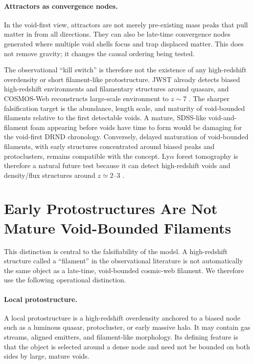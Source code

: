 \documentclass[11pt,a4paper]{article}
\begin{document}
\paragraph{Attractors as convergence nodes.}
In the void-first view, attractors are not merely pre-existing mass peaks that pull matter in from all directions. They can also be late-time convergence nodes generated where multiple void shells focus and trap displaced matter. This does not remove gravity; it changes the causal ordering being tested.

The observational ``kill switch'' is therefore not the existence of any high-redshift overdensity or short filament-like protostructure. JWST already detects biased high-redshift environments and filamentary structures around quasars, and COSMOS-Web reconstructs large-scale environment to $z\sim7$ \cite{wang2023,hatamnia2026}. The sharper falsification target is the abundance, length scale, and maturity of void-bounded filaments relative to the first detectable voids. A mature, SDSS-like void-and-filament foam appearing before voids have time to form would be damaging for the void-first DRND chronology. Conversely, delayed maturation of void-bounded filaments, with early structures concentrated around biased peaks and protoclusters, remains compatible with the concept. Ly$\alpha$ forest tomography is therefore a natural future test because it can detect high-redshift voids and density/flux structures around $z\simeq2$--3 \cite{krolewski2018,stark2015}.

\section{Early Protostructures Are Not Mature Void-Bounded Filaments}

This distinction is central to the falsifiability of the model. A high-redshift structure called a ``filament'' in the observational literature is not automatically the same object as a late-time, void-bounded cosmic-web filament. We therefore use the following operational distinction.

\paragraph{Local protostructure.}
A local protostructure is a high-redshift overdensity anchored to a biased node such as a luminous quasar, protocluster, or early massive halo. It may contain gas streams, aligned emitters, and filament-like morphology. Its defining feature is that the object is selected around a dense node and need not be bounded on both sides by large, mature voids.
\end{document}
